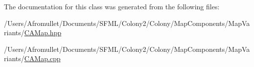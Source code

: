 The documentation for this class was generated from the following files\+:\begin{DoxyCompactItemize}
\item 
/\+Users/\+Afromullet/\+Documents/\+S\+F\+M\+L/\+Colony2/\+Colony/\+Map\+Components/\+Map\+Variants/\mbox{\hyperlink{_c_a_map_8hpp}{C\+A\+Map.\+hpp}}\item 
/\+Users/\+Afromullet/\+Documents/\+S\+F\+M\+L/\+Colony2/\+Colony/\+Map\+Components/\+Map\+Variants/\mbox{\hyperlink{_c_a_map_8cpp}{C\+A\+Map.\+cpp}}\end{DoxyCompactItemize}
